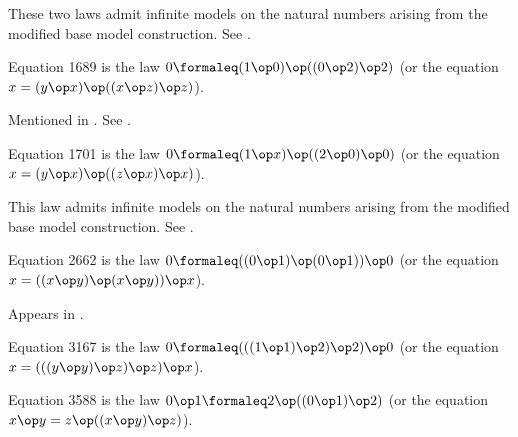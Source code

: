 These two laws admit infinite models on the natural numbers arising from the modified base model construction. See .

\begin{definition}[Equation 1689]\label{eq1689}\leanok{}  Equation 1689 is the law $0 \formaleq  (1 \op 0) \op ((0 \op 2) \op 2)$ (or the equation $x = (y \op x) \op ((x \op z) \op z)$).
\end{definition}

Mentioned in \cite{Kisielewicz2}.  See .

\begin{definition}[Equation 1701]\label{eq1701}\leanok{}  Equation 1701 is the law $0 \formaleq  (1 \op x) \op ((2 \op 0) \op 0)$ (or the equation $x = (y \op x) \op ((z \op x) \op x)$).
\end{definition}

This law admits infinite models on the natural numbers arising from the modified base model construction. See .

\begin{definition}[Equation 2662]\label{eq2662}\leanok{}  Equation 2662 is the law $0 \formaleq  ((0 \op 1) \op (0 \op 1)) \op 0$ (or the equation $x = ((x \op y) \op (x \op y)) \op x$).
\end{definition}

Appears in \cite{mendelsohn-padmanabhan}.

\begin{definition}[Equation 3167]\label{eq3167}\leanok{}  Equation 3167 is the law $0 \formaleq  (((1 \op 1) \op 2) \op 2) \op 0$ (or the equation $x = (((y \op y) \op z) \op z) \op x$).
\end{definition}


\begin{definition}[Equation 3588]
  \label{eq3588}\leanok{}
  Equation 3588 is the law $0 \op 1 \formaleq 2 \op ((0 \op 1) \op 2)$ (or the equation $x \op y = z \op ((x \op y) \op z)$).
\end{definition}

